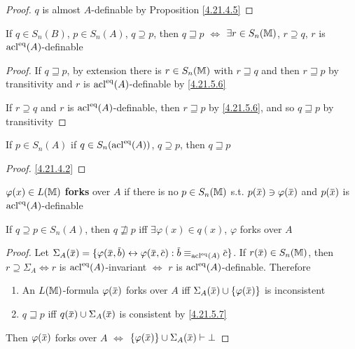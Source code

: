 \documentclass[11pt]{article}
\begin{document}
\begin{proof}
\(q\) is almost \(A\)-definable by Proposition \ref{4.21.4.5}
\end{proof}

\begin{proposition}[]
\label{4.21.5.7}
If \(q\in S_n(B)\), \(p\in S_n(A)\), \(q\supseteq p\), then
\(q\sqsupseteq p\) \(\Leftrightarrow\) \(\exists r\in S_n(\mathbb{M})\), \(r\supseteq q\), \(r\) is \(\operatorname{acl}^{\operatorname{eq}}(A)\)-definable
\end{proposition}

\begin{proof}
If \(q\sqsupseteq p\), by extension there is \(r\in S_n(\mathbb{M})\) with \(r\sqsupseteq q\)  and then \(r\sqsupseteq p\) by
transitivity and \(r\) is \(\operatorname{acl}^{\operatorname{eq}}(A)\)-definable by \ref{4.21.5.6}

If \(r\supseteq q\) and \(r\) is \(\operatorname{acl}^{\operatorname{eq}}(A)\)-definable, then \(r\sqsupseteq p\) by \ref{4.21.5.6}, and
so \(q\sqsupseteq p\) by transitivity
\end{proof}

\begin{proposition}[]
\label{4.21.5.8}
If \(p\in S_n(A)\) if \(q\in S_n(\operatorname{acl}^{\operatorname{eq}}(A))\), \(q\supseteq p\), then \(q\sqsupseteq p\)
\end{proposition}

\begin{proof}
\ref{4.21.4.2}
\end{proof}

\begin{definition}[]
\(\varphi(x)\in L(\mathbb{M})\) \textbf{forks} over \(A\) if there is no \(p\in S_n(\mathbb{M})\) s.t. \(p(\barx)\ni\varphi(\barx)\)
and \(p(\barx)\) is \(\operatorname{acl}^{\operatorname{eq}}(A)\)-definable
\end{definition}

\begin{proposition}[]
If \(q\supseteq p\in S_n(A)\), then \(q\not\sqsupseteq p\) iff \(\exists\varphi(x)\in q(x)\), \(\varphi\) forks over \(A\)
\end{proposition}

\begin{proof}
Let \(\Sigma_A(\barx)=\{\varphi(\barx,\barb)\leftrightarrow\varphi(\barx,\barc):\barb\equiv_{\acl^{\eq}(A)}\barc\}\).
If \(r(\barx)\in S_n(\M)\), then \(r\supseteq\Sigma_A\Leftrightarrow r\) is \(\operatorname{acl}^{\operatorname{eq}}(A)\)-invariant \(\Leftrightarrow\) \(r\)
is \(\operatorname{acl}^{\operatorname{eq}}(A)\)-definable. Therefore
\begin{enumerate}
\item An \(L(\mathbb{M})\)-formula \(\varphi(\barx)\) forks over \(A\) iff \(\Sigma_A(\barx)\cup\{\varphi(\barx)\}\) is
inconsistent
\item \(q\sqsupseteq p\) iff \(q(\barx)\cup\Sigma_A(\barx)\) is consistent by \ref{4.21.5.7}
\end{enumerate}

Then \(\varphi(\barx)\) forks over \(A\) \(\Leftrightarrow\) \(\{\varphi(\barx)\}\cup\Sigma_A(\barx)\vdash\bot\)
\end{proof}
\end{document}
